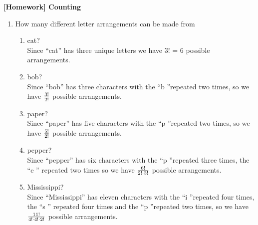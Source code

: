 \documentclass[12pt]{article}%
\newcommand{\0}{{\bf 0}}
\newcommand{\ra}[1]{\renewcommand{\arraystretch}{#1}}
\begin{document}
\newcommand{\ngi}{n \ra \infty}

\pagestyle{myheadings} 

\thispagestyle{plain}


\begin{center}
{\Large\bf [Homework] Counting} 
\end{center}





\begin{enumerate}





\item
How many different letter arrangements can be made from 
\begin{enumerate}
\item cat?
\\
{\color{blue}{\bf Sol.}}
Since “cat” has three unique letters we have 3! = 6 possible arrangements.
\item bob?
\\
{\color{blue}{\bf Sol.}}
Since “bob” has three characters with the \textquotedblleft b \textquotedblright repeated two times, so we have $\frac{3!}{2!}$ possible arrangements.
\item paper?
\\
{\color{blue}{\bf Sol.}}
Since “paper” has five characters with the \textquotedblleft p \textquotedblright repeated two times, so we have $\frac{5!}{2!}$ possible arrangements.
\item pepper?
\\
{\color{blue}{\bf Sol.}}
Since “pepper” has six characters with the \textquotedblleft p \textquotedblright repeated three times, the \textquotedblleft e \textquotedblright
repeated two times so we have $\frac{6!}{2!\cdot3!}$ possible arrangements.
\item Mississippi?
\\
{\color{blue}{\bf Sol.}}
Since “Mississippi” has eleven characters with the \textquotedblleft i \textquotedblright repeated four times, the \textquotedblleft s \textquotedblright
repeated four times and the \textquotedblleft p \textquotedblright repeated two times, so we have $\frac{11!}{4!\cdot4!\cdot2!}$ possible arrangements.
\end{enumerate}






\end{enumerate}
\end{document}
